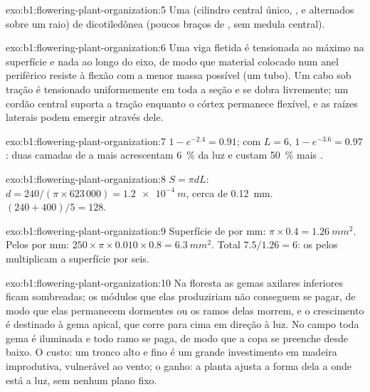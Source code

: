 \begin{solution}{exo:b1:flowering-plant-organization:5}
Uma  (cilindro central único, ,  e  alternados
sobre um raio) de dicotiledônea (poucos braços de , sem medula
central).
\end{solution}

\begin{solution}{exo:b1:flowering-plant-organization:6}
Uma viga fletida é tensionada ao máximo na superfície e nada ao longo do
eixo, de modo que material colocado num anel periférico resiste à flexão
com a menor massa possível (um tubo). Um cabo sob tração é tensionado
uniformemente em toda a seção e se dobra livremente; um cordão central
suporta a tração enquanto o córtex permanece flexível, e as raízes
laterais podem emergir através dele.
\end{solution}

\begin{solution}{exo:b1:flowering-plant-organization:7}
$1 - e^{-2.4} = 0.91$; com $L = 6$, $1 - e^{-3.6} = 0.97$: duas camadas
de  a mais acrescentam \qty{6}{\%} da luz e custam \qty{50}{\%}
mais .
\end{solution}

\begin{solution}{exo:b1:flowering-plant-organization:8}
$S = \pi d L$: $d = 240/(\pi\times 623\,000) = \qty{1.2e-4}{m}$, cerca
de \qty{0.12}{mm}. $(240 + 400)/5 = 128$.
\end{solution}

\begin{solution}{exo:b1:flowering-plant-organization:9}
Superfície de  por mm: $\pi\times 0.4 = \qty{1.26}{mm^2}$. Pelos por
mm: $250\times\pi\times 0.010\times 0.8 = \qty{6.3}{mm^2}$. Total
$7.5/1.26 = 6$: os pelos multiplicam a superfície por seis.
\end{solution}

\begin{solution}{exo:b1:flowering-plant-organization:10}
Na floresta as gemas axilares inferiores ficam sombreadas; os módulos
que elas produziriam não conseguem se pagar, de modo que elas
permanecem dormentes ou os ramos delas morrem, e o crescimento é
destinado à gema apical, que corre para cima em direção à luz. No campo
toda gema é iluminada e todo ramo se paga, de modo que a copa se
preenche desde baixo. O custo: um tronco alto e fino é um grande
investimento em madeira improdutiva, vulnerável ao vento; o ganho: a
planta ajusta a forma dela a onde está a luz, sem nenhum plano fixo.
\end{solution}


